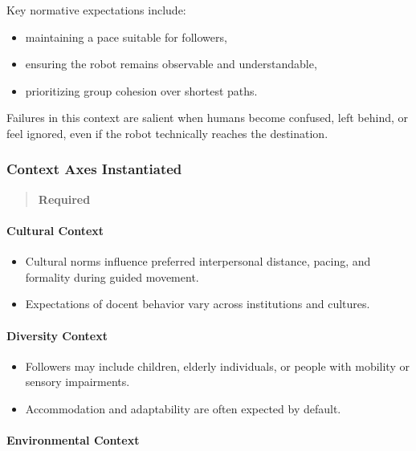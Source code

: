 \documentclass[utf8]{frontiers_suppmat} %
\providecommand{\tightlist}{%
  \setlength{\itemsep}{0pt}\setlength{\parskip}{0pt}}
\begin{document}
Key normative expectations include:

\begin{itemize}
\tightlist
\item
  maintaining a pace suitable for followers,
\item
  ensuring the robot remains observable and understandable,
\item
  prioritizing group cohesion over shortest paths.
\end{itemize}

Failures in this context are salient when humans become confused, left
behind, or feel ignored, even if the robot technically reaches the
destination.

\subsubsection{Context Axes
Instantiated}\label{context-axes-instantiated}

\begin{quote}
\textbf{Required}
\end{quote}

\paragraph{Cultural Context}\label{cultural-context}

\begin{itemize}
\tightlist
\item
  Cultural norms influence preferred interpersonal distance, pacing, and
  formality during guided movement.
\item
  Expectations of docent behavior vary across institutions and cultures.
\end{itemize}

\paragraph{Diversity Context}\label{diversity-context}

\begin{itemize}
\tightlist
\item
  Followers may include children, elderly individuals, or people with
  mobility or sensory impairments.
\item
  Accommodation and adaptability are often expected by default.
\end{itemize}

\paragraph{Environmental Context}\label{environmental-context}
\end{document}

